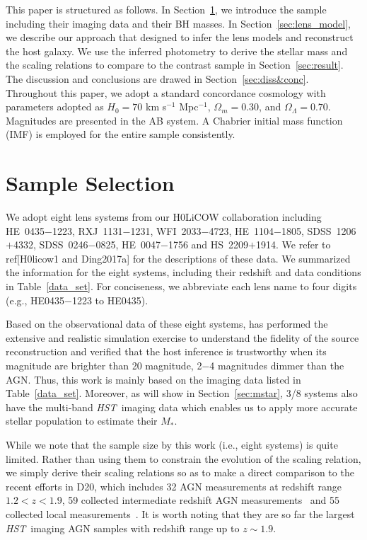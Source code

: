 \documentclass[fleqn,usenatbib]{mnras}
\newcommand{\hst}{{\it HST}}
\newcommand{\mstar}{{$M_*$}}
\begin{document}
This paper is structured as follows. In Section~\ref{sec:sample_select}, we introduce the sample including their imaging data and their BH masses. In Section~\ref{sec:lens_model}, we describe our approach that designed to infer the lens models and reconstruct the host galaxy. We use the inferred photometry  to derive the stellar mass and the scaling relations to compare to the contrast sample in Section~\ref{sec:result}. The discussion and conclusions are drawed in Section~\ref{sec:diss&conc}. Throughout this paper, we adopt a standard concordance cosmology with parameters adopted as $H_0= 70$ km s$^{-1}$ Mpc$^{-1}$, $\Omega{_m} = 0.30$, and $\Omega{_\Lambda} = 0.70$. Magnitudes are presented in the AB system. A Chabrier initial mass function (IMF) is employed for the entire sample consistently.

\section{Sample Selection}\label{sec:sample_select}
We adopt eight lens systems from our H0LiCOW collaboration including HE~0435$-$1223, RXJ~1131$-$1231, WFI~2033$-$4723, HE~1104$-$1805, SDSS~1206$+$4332, SDSS~0246$-$0825, HE~0047$-$1756 and HS~2209$+$1914. We refer to ref[H0licow1 and Ding2017a] for the descriptions of these data. We summarized the information for the eight systems, including their redshift and data conditions in Table~\ref{data_set}.
For conciseness, we abbreviate each lens name to four digits (e.g., HE0435$-$1223 to HE0435). 

Based on the observational data of these eight systems, \citet{Ding2017a} has performed the extensive and realistic simulation exercise to understand the fidelity of the source reconstruction and verified that the host inference is trustworthy when its magnitude are brighter than 20 magnitude, 2$-$4 magnitudes dimmer than the AGN. Thus, this work is mainly based on the imaging data listed in Table~\ref{data_set}. Moreover, as will show in Section~\ref{sec:mstar}, 3/8 systems also have the multi-band \hst\ imaging data which  enables us to apply more accurate stellar population to estimate their \mstar. 

While we note that the sample size by this work (i.e., eight systems) is quite limited. Rather than using them to constrain the evolution of the scaling relation, we simply derive their scaling relations so as to make a direct comparison to the recent efforts in D20, which includes 32 AGN measurements at redshift range $1.2<z<1.9$, 59 collected intermediate redshift AGN measurements~\citep{Bennert11, SS13, Cisternas2011} and 55 collected local measurements~\citep{Bennert++2011, H+R04}. It is worth noting that they are so far the largest \hst\ imaging AGN samples with redshift range up to $z\sim1.9$. 
 
\end{document}
